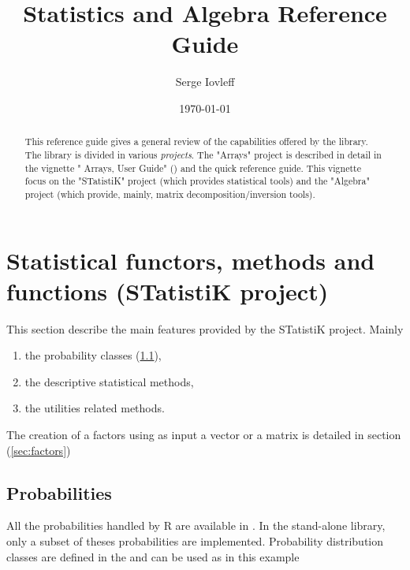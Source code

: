 \documentclass[a4paper,10pt]{article}
\title{\stkpp{} Statistics and Algebra Reference Guide}
\author{Serge Iovleff}
\date{\today}
\begin{document}


\maketitle

\begin{abstract}
This reference guide gives a general review of the capabilities offered
by the \stkpp{} library. The library is divided in various \emph{projects}.
The "Arrays" project is described in detail in the vignette "\stkpp{} Arrays,
User Guide" (\cite{rtkore-Arrays}) and the quick reference guide.
This vignette focus on the "STatistiK" project (which provides statistical tools)
and the "Algebra" project (which provide, mainly, matrix decomposition/inversion
tools).
\end{abstract}

\tableofcontents

\section{Statistical functors, methods and functions (STatistiK project)}
\label{sec:STatistiK}

This section describe the main features provided by the STatistiK project. Mainly
\begin{enumerate}
\item the probability classes (\ref{subsec:prob}),
\item the descriptive statistical methods,
\item the utilities related methods.
\end{enumerate}
The creation of a factors using as input a vector or a matrix is detailed in
section (\ref{sec:factors})

\subsection{Probabilities }
\label{subsec:prob}
All the probabilities handled by R are available in \rtkore{}. In the
stand-alone \stkpp{} library, only a subset of theses probabilities are
implemented. Probability distribution classes are defined in the
 and can be used as in this example

\begin{minipage}[t]{0.66\textwidth}

\end{minipage}
\hspace{0.2cm}
\begin{minipage}[t]{0.33\textwidth}
\addtocounter{lstlisting}{-1}

\end{minipage}
\end{document}
